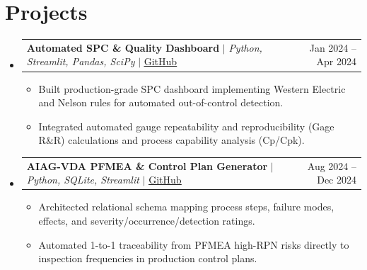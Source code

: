 \documentclass[letterpaper,11pt]{article}
\makeatletter
\newcommand{\resumeItem}[1]{\item\small{#1}}
\newcommand{\resumeEntry}[2]{\item\begin{tabular*}{0.97\textwidth}{l@{\extracolsep{\fill}}r}#1 & #2 \\\end{tabular*}}
\newcommand{\resumeSubHeadingListStart}{\begin{itemize}[leftmargin=0.15in,label={},itemsep=2pt,parsep=0pt,topsep=2pt,partopsep=0pt]}
\newcommand{\resumeSubHeadingListEnd}{\end{itemize}}
\newcommand{\resumeItemListStart}{\begin{itemize}[itemsep=1pt,parsep=0pt,topsep=0pt,partopsep=0pt]}
\newcommand{\resumeItemListEnd}{\end{itemize}}
\makeatother
\begin{document}
\section{Projects}
\resumeSubHeadingListStart
  \resumeEntry{\textbf{Automated SPC \& Quality Dashboard} $|$ \emph{Python, Streamlit, Pandas, SciPy} $|$ \href{https://github.com/example/spc-dashboard}{\underline{GitHub}}}{Jan 2024 -- Apr 2024}
  \resumeItemListStart
    \resumeItem{Built production-grade SPC dashboard implementing Western Electric and Nelson rules for automated out-of-control detection.}
    \resumeItem{Integrated automated gauge repeatability and reproducibility (Gage R\&R) calculations and process capability analysis (Cp/Cpk).}
  \resumeItemListEnd

  \resumeEntry{\textbf{AIAG-VDA PFMEA \& Control Plan Generator} $|$ \emph{Python, SQLite, Streamlit} $|$ \href{https://github.com/example/pfmea-tool}{\underline{GitHub}}}{Aug 2024 -- Dec 2024}
  \resumeItemListStart
    \resumeItem{Architected relational schema mapping process steps, failure modes, effects, and severity/occurrence/detection ratings.}
    \resumeItem{Automated 1-to-1 traceability from PFMEA high-RPN risks directly to inspection frequencies in production control plans.}
  \resumeItemListEnd
\resumeSubHeadingListEnd
\end{document}
